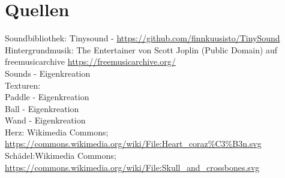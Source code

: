 \section{Quellen}
Soundbibliothek: Tinysound -  \url{https://github.com/finnkuusisto/TinySound}\\
Hintergrundmusik: The Entertainer von Scott Joplin (Public Domain) auf freemusicarchive  \url{https://freemusicarchive.org/}\\
Sounds - Eigenkreation \\
Texturen:\\
Paddle - Eigenkreation\\
Ball - Eigenkreation\\
Wand - Eigenkreation\\
Herz: Wikimedia Commons; \url{https://commons.wikimedia.org/wiki/File:Heart\_coraz\%C3\%B3n.svg}\\
Schädel:Wikimedia Commons; \url{https://commons.wikimedia.org/wiki/File:Skull\_and\_crossbones.svg}\\